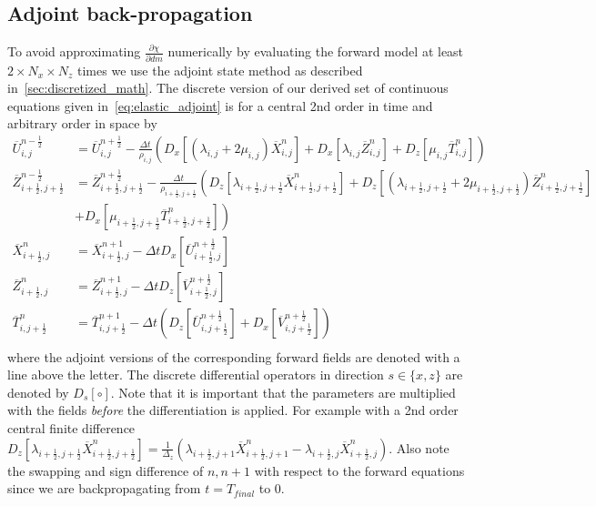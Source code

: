 \documentclass[10pt]{SelfArx} %
\newcommand{\pder}[2][]{\frac{\partial#1}{\partial#2}}
\theoremstyle{definition}
\begin{document}
\subsection{Adjoint back-propagation}
To avoid approximating $\pder[\chi]{dm}$ numerically by evaluating the forward model at least  $2 \times N_x \times N_z$ times we use the adjoint state method as described in~\cref{sec:discretized_math}. The discrete version of our derived set of continuous equations given in~\cref{eq:elastic_adjoint} is for a central 2nd order in time and arbitrary order in space by
\begin{equation}\label{eq:discretized_elastic_adjoint_written_out}
    \begin{aligned}
    \overline{U}^{n-\frac{1}{2}}_{i,j} &= \overline{U}^{n+\frac{1}{2}}_{i,j} - \frac{\Delta t}{\rho_{i,j}} \left(D_x\left[\left(\lambda_{i,j} + 2\mu_{i,j}\right)\overline{X}_{i,j}^n\right] + D_x\left[\lambda_{i,j} \overline{Z}^n_{i,j}\right] + D_z\left[\mu_{i,j}\overline{T}_{i,j}^n\right] \right) \\
    \overline{Z}^{n-\frac{1}{2}}_{i+\frac{1}{2},j+\frac{1}{2}} &= \overline{Z}^{n+\frac{1}{2}}_{i+\frac{1}{2}, j+\frac{1}{2}} - \frac{\Delta t}{\rho_{i+\frac{1}{2},j+\frac{1}{2}}} \left(D_z\left[\lambda_{i+\frac{1}{2},j+\frac{1}{2}}\overline{X}_{i+\frac{1}{2},j+\frac{1}{2}}^n\right] + D_z\left[\left(\lambda_{i+\frac{1}{2},j+\frac{1}{2}}+2\mu_{i+\frac{1}{2},j+\frac{1}{2}}\right) \overline{Z}^n_{i+\frac{1}{2},j+\frac{1}{2}}\right]\right. \\
    &\left.+ D_x\left[\mu_{i+\frac{1}{2},j+\frac{1}{2}}\overline{T}_{i+\frac{1}{2},j+\frac{1}{2}}^n\right] \right) \\
    \overline{X}_{i+\frac{1}{2},j}^{n} &= \overline{X}_{i+\frac{1}{2},j}^{n+1} - \Delta t D_x\left[\overline{U}^{n+\frac{1}{2}}_{i+\frac{1}{2},j}\right] \\
    \overline{Z}_{i+\frac{1}{2},j}^{n} &= \overline{Z}_{i+\frac{1}{2},j}^{n+1} - \Delta t D_z\left[\overline{V}^{n+\frac{1}{2}}_{i+\frac{1}{2},j}\right] \\
    \overline{T}_{i,j+\frac{1}{2}}^{n} &= \overline{T}_{i,j+\frac{1}{2}}^{n+1} - \Delta t \left(D_z\left[\overline{U}^{n+\frac{1}{2}}_{i,j + \frac{1}{2}}\right] + D_x\left[\overline{V}^{n+\frac{1}{2}}_{i,j + \frac{1}{2}}\right]\right) \\
\end{aligned}
\end{equation}
where the adjoint versions of the corresponding forward fields are denoted with a line above the letter. The discrete differential operators in direction $s\in\{x,z\}$ are denoted by $D_s\left[\circ\right]$. Note that it is important that the parameters are multiplied with the fields \emph{before} the differentiation is applied. For example with a 2nd order central finite difference $D_z\left[\lambda_{i+\frac{1}{2},j+\frac{1}{2}}\overline{X}_{i+\frac{1}{2},j+\frac{1}{2}}^n\right] = \frac{1}{\Delta_z}\left(\lambda_{i+\frac{1}{2},j+1}\overline{X}_{i+\frac{1}{2},j+1}^n - \lambda_{i+\frac{1}{2},j}\overline{X}_{i+\frac{1}{2},j}^n\right)$. Also note the swapping and sign difference of $n, n+1$ with respect to the forward equations since we are backpropagating from $t=T_{final}$ to $0$. 
\end{document}
